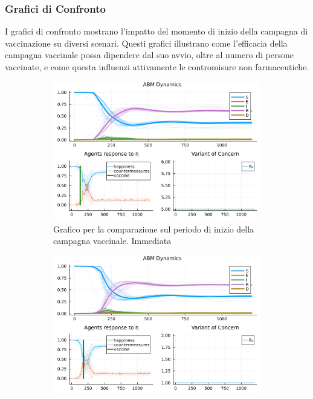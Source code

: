 \subsubsection{Grafici di Confronto}

I grafici di confronto mostrano l'impatto del momento di inizio della 
campagna di vaccinazione su diversi scenari. Questi grafici illustrano 
come l'efficacia della campagna vaccinale possa dipendere dal suo avvio, 
oltre al numero di persone vaccinate, e come questa influenzi attivamente
le contromisure non farmaceutiche.

\begin{figure}[!hb]
	\centering
	\begin{subfigure}[b]{0.45\textwidth}
		\centering
		\includegraphics[width=\textwidth]{img/SocialNetworkABM_5_A.jpg}
		\caption{Grafico per la comparazione sul periodo di inizio della campagna vaccinale. Immediata}
		\label{fig:comparison_all_1}
	\end{subfigure}
	\hfill
	\begin{subfigure}[b]{0.45\textwidth}
		\centering
		\includegraphics[width=\textwidth]{img/SocialNetworkABM_1_A.jpg}

\end{subfigure}
\end{figure}
